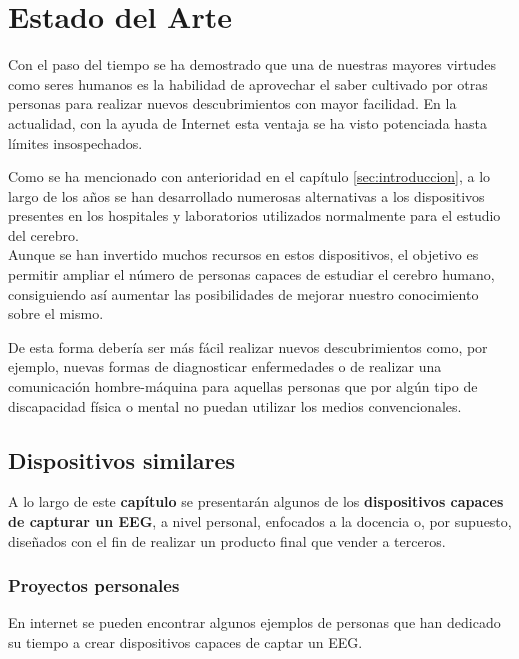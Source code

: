 \chapter{Estado del Arte\label{sec:EstadoDelArte}}

Con el paso del tiempo se ha demostrado que una de nuestras mayores virtudes como seres humanos es la habilidad de aprovechar el saber cultivado por otras personas para realizar nuevos descubrimientos con mayor facilidad. En la actualidad, con la ayuda de Internet esta ventaja se ha visto potenciada hasta límites insospechados.

Como se ha mencionado con anterioridad en el capítulo \ref{sec:introduccion}, a lo largo de los años se han desarrollado numerosas alternativas a los dispositivos presentes en los hospitales y laboratorios utilizados normalmente para el estudio del cerebro. 
\\Aunque se han invertido muchos recursos en estos dispositivos, el objetivo es permitir ampliar el número de personas capaces de estudiar el cerebro humano, consiguiendo  así aumentar las posibilidades de mejorar nuestro conocimiento sobre el mismo.

De esta forma debería ser más fácil realizar nuevos descubrimientos como, por ejemplo, nuevas formas de diagnosticar enfermedades o de realizar una comunicación hombre-máquina para aquellas personas que por algún tipo de discapacidad física o mental no puedan utilizar los medios convencionales.

\clearpage

\section{Dispositivos similares\label{sec:Disp_similares}}

A lo largo de este \textbf{capítulo} se presentarán algunos de los \textbf{dispositivos capaces de capturar un \acrshort{EEG}}, a nivel personal, enfocados a la docencia o, por supuesto, diseñados con el fin de realizar un producto final que vender a terceros.

\subsection{Proyectos personales\label{sec:Pro_personales}}

En internet se pueden encontrar algunos ejemplos de personas que han dedicado su tiempo a crear dispositivos capaces de captar un \acrshort{EEG}. 

